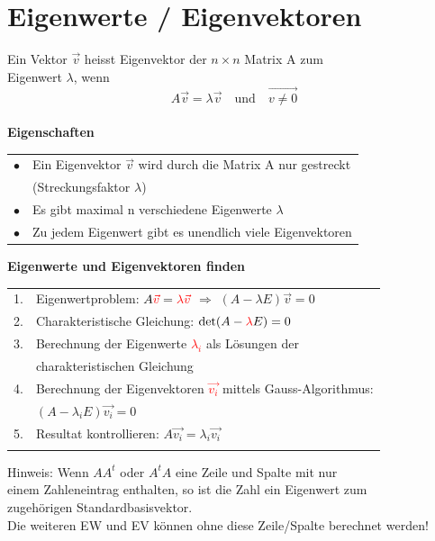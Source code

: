
		 \section{Eigenwerte / Eigenvektoren}   
		 Ein Vektor $\vec{v}$ heisst Eigenvektor der $n \times n$ Matrix A zum \\
		 Eigenwert $\lambda$, wenn 
		$$A \vec{v} = \lambda \vec{v} \quad \text{und} \quad \vec{v \neq 0}$$
		\\
		\textbf{Eigenschaften}\\
		\begin{tabular}{ll}
		$\bullet$ & Ein Eigenvektor $\vec{v}$ wird durch die Matrix A nur gestreckt \\
		& (Streckungsfaktor $\lambda$) \\
		$\bullet$ & Es gibt maximal n verschiedene Eigenwerte $\lambda$ \\
		$\bullet$ & Zu jedem Eigenwert gibt es unendlich viele Eigenvektoren \\
		\end{tabular}		 
		 
	 
	 
		 \textbf{Eigenwerte und Eigenvektoren finden} \\
		 \begin{tabular}{ll}
		1. & Eigenwertproblem: $A \textcolor{red}{\vec{v}} = \textcolor{red}{\lambda \vec{v}}$ $\Rightarrow$  $(A - \lambda E) \vec{v} = 0$  \\
		2. & Charakteristische Gleichung: $\det(A -  \textcolor{red}{\lambda} E) = 0$ \\
		3. & Berechnung der Eigenwerte \textcolor{red}{$\lambda_i$} als Lösungen der \\
		& charakteristischen Gleichung \\
		4. & Berechnung der Eigenvektoren \textcolor{red}{$\vec{v_i}$} mittels Gauss-Algorithmus: \\
		& $(A - \lambda_i E) \vec{v_i} = 0$ \\
		5. & Resultat kontrollieren: $A \vec{v_i} = \lambda_i \vec{v_i}$ \\
		\\
		\end{tabular}		 
		
		
		Hinweis: Wenn $AA^t$ oder $A^tA$	eine Zeile und Spalte mit nur\\
		einem Zahleneintrag enthalten, so ist die Zahl ein Eigenwert zum \\
		zugehörigen Standardbasisvektor. \\
		Die weiteren EW und EV können ohne diese Zeile/Spalte berechnet werden!	   
			

